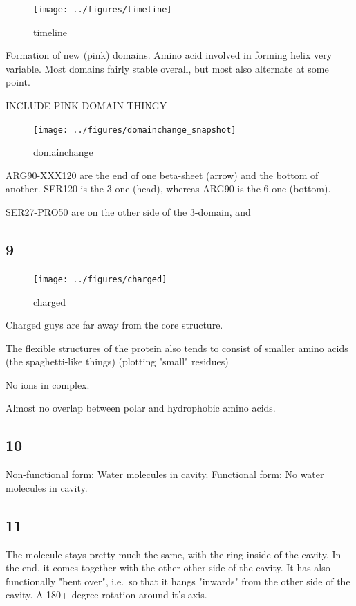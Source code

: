 \documentclass[10pt]{article}\usepackage[]{graphicx}\usepackage[]{color}
\theoremstyle{plain}
\begin{document}
\begin{figure}[H]
	\centering
	\texttt{[image: ../figures/timeline]}
	\caption{timeline}
	\label{fig:timeline}
\end{figure}
\begin{multicols*}{2}
	
	Formation of new (pink) domains. Amino acid involved in forming helix very variable. Most domains fairly stable overall, but most also alternate at some point. 
	
	INCLUDE PINK DOMAIN THINGY
	\begin{figure}[H]
		\centering
		\texttt{[image: ../figures/domainchange\_snapshot]}
		\caption{domainchange}
		\label{fig:domchange}
	\end{figure}
	
	ARG90-XXX120 are the end of one beta-sheet (arrow) and the bottom of another. SER120 is the 3-one (head), whereas ARG90 is the 6-one (bottom). 
	
	SER27-PRO50 are on the other side of the 3-domain, and  
	
	
	
	\subsection{9}
	\begin{figure}[H]
		\centering
		\texttt{[image: ../figures/charged]}
		\caption{charged}
		\label{fig:charged}
	\end{figure}
	
	Charged guys are far away from the core structure. 
	
	The flexible structures of the protein also tends to consist of smaller amino acids (the spaghetti-like things) (plotting "small" residues)
	
	No ions in complex.
	
	Almost no overlap between polar and hydrophobic amino acids.
	
	
	\subsection{10}
	Non-functional form: Water molecules in cavity.
	Functional form: No water molecules in cavity.
	
	\subsection{11}
	The molecule stays pretty much the same, with the ring inside of the cavity. In the end, it comes together with the other other side of the cavity. It has also functionally "bent over", i.e.\ so that it hangs "inwards" from the other side of the cavity. A 180+ degree rotation around it's axis.  
	
	
	
	
	
\end{multicols*}
\end{document}

